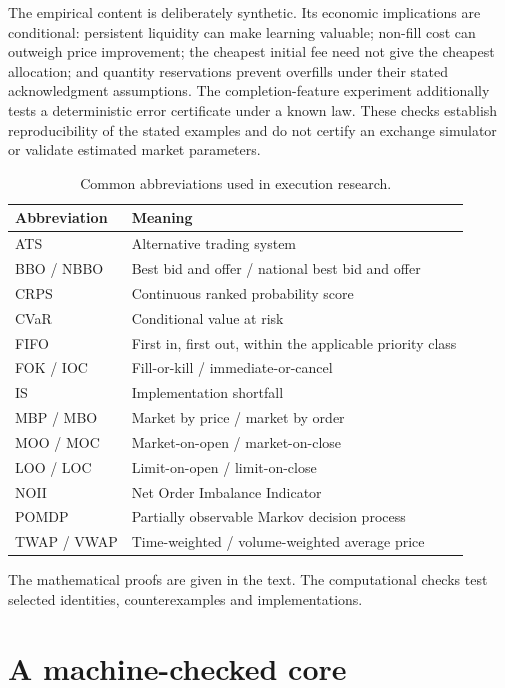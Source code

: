 \documentclass[11pt]{article}
\numberwithin{equation}{section}
\theoremstyle{definition}
\theoremstyle{remark}
\theoremstyle{definition}
\begin{document}
The empirical content is deliberately synthetic. Its economic implications
are conditional: persistent liquidity can make learning valuable; non-fill
cost can outweigh price improvement; the cheapest initial fee need not give
the cheapest allocation; and quantity reservations prevent overfills under
their stated acknowledgment assumptions. The completion-feature experiment
additionally tests a deterministic error certificate under a known law.
These checks establish reproducibility of the stated examples and do not
certify an exchange simulator or validate estimated market parameters.

\begin{table}[tb]
\centering\small
\caption{Common abbreviations used in execution research.}
\begin{tabularx}{\textwidth}{lY}
\toprule Abbreviation & Meaning \\\midrule
ATS & Alternative trading system \\
BBO / NBBO & Best bid and offer / national best bid and offer \\
CRPS & Continuous ranked probability score \\
CVaR & Conditional value at risk \\
FIFO & First in, first out, within the applicable priority class \\
FOK / IOC & Fill-or-kill / immediate-or-cancel \\
IS & Implementation shortfall \\
MBP / MBO & Market by price / market by order \\
MOO / MOC & Market-on-open / market-on-close \\
LOO / LOC & Limit-on-open / limit-on-close \\
NOII & Net Order Imbalance Indicator \\
POMDP & Partially observable Markov decision process \\
TWAP / VWAP & Time-weighted / volume-weighted average price \\
\bottomrule
\end{tabularx}
\end{table}

The mathematical proofs are given in the text. The computational checks test
selected identities, counterexamples and implementations.

\section{A machine-checked core}\label{app:lean}
\end{document}
